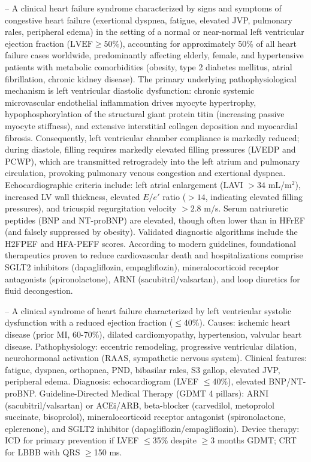 -- A clinical heart failure syndrome characterized by signs and symptoms of congestive heart failure (exertional dyspnea, fatigue, elevated JVP, pulmonary rales, peripheral edema) in the setting of a normal or near-normal left ventricular ejection fraction ($\text{LVEF} \ge 50\%$), accounting for approximately 50\% of all heart failure cases worldwide, predominantly affecting elderly, female, and hypertensive patients with metabolic comorbidities (obesity, type 2 diabetes mellitus, atrial fibrillation, chronic kidney disease). The primary underlying pathophysiological mechanism is left ventricular diastolic dysfunction: chronic systemic microvascular endothelial inflammation drives myocyte hypertrophy, hypophosphorylation of the structural giant protein titin (increasing passive myocyte stiffness), and extensive interstitial collagen deposition and myocardial fibrosis. Consequently, left ventricular chamber compliance is markedly reduced; during diastole, filling requires markedly elevated filling pressures (LVEDP and PCWP), which are transmitted retrogradely into the left atrium and pulmonary circulation, provoking pulmonary venous congestion and exertional dyspnea. Echocardiographic criteria include: left atrial enlargement (LAVI $>34$ mL/m$^2$), increased LV wall thickness, elevated $E/e'$ ratio ($>14$, indicating elevated filling pressures), and tricuspid regurgitation velocity $>2.8$ m/s. Serum natriuretic peptides (BNP and NT-proBNP) are elevated, though often lower than in HFrEF (and falsely suppressed by obesity). Validated diagnostic algorithms include the H2FPEF and HFA-PEFF scores. According to modern guidelines, foundational therapeutics proven to reduce cardiovascular death and hospitalizations comprise SGLT2 inhibitors (dapagliflozin, empagliflozin), mineralocorticoid receptor antagonists (spironolactone), ARNI (sacubitril/valsartan), and loop diuretics for fluid decongestion.

-- A clinical syndrome of heart failure characterized by left ventricular systolic dysfunction with a reduced ejection fraction (\(\le\)40\%). Causes: ischemic heart disease (prior MI, 60-70\%), dilated cardiomyopathy, hypertension, valvular heart disease. Pathophysiology: eccentric remodeling, progressive ventricular dilation, neurohormonal activation (RAAS, sympathetic nervous system). Clinical features: fatigue, dyspnea, orthopnea, PND, bibasilar rales, S3 gallop, elevated JVP, peripheral edema. Diagnosis: echocardiogram (LVEF \(\le\)40\%), elevated BNP/NT-proBNP. Guideline-Directed Medical Therapy (GDMT 4 pillars): ARNI (sacubitril/valsartan) or ACEi/ARB, beta-blocker (carvedilol, metoprolol succinate, bisoprolol), mineralocorticoid receptor antagonist (spironolactone, eplerenone), and SGLT2 inhibitor (dapagliflozin/empagliflozin). Device therapy: ICD for primary prevention if LVEF \(\le\)35\% despite \(\ge\)3 months GDMT; CRT for LBBB with QRS \(\ge\)150 ms.

